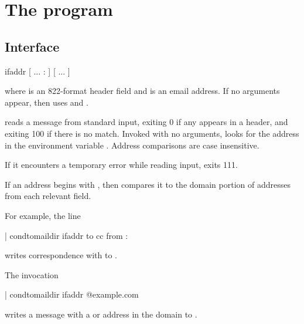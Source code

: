 
\chapter{The  program}

\section{Interface}
\begin{code}
  ifaddr [  ... : ] [  ... ]
\end{code}
where  is an 822-format header field and  is an email
address.  If no  arguments appear, then  uses
 and .

 reads a message from standard input, exiting 0 if any 
appears in a  header, and exiting 100 if there is no match.  Invoked
with no  arguments,  looks for the address in the
environment variable .  Address comparisons are case
insensitive.

If it encounters a temporary error while reading input,  exits 111.

If an address begins with , then  compares it to the domain
portion of addresses from each relevant field.


For example, the  line
\begin{code}
  | condtomaildir  ifaddr to cc from : 
\end{code}
writes correspondence with  to .

The invocation
\begin{code}
  | condtomaildir  ifaddr @example.com
\end{code}
writes a message with a  or  address in the domain
 to .

